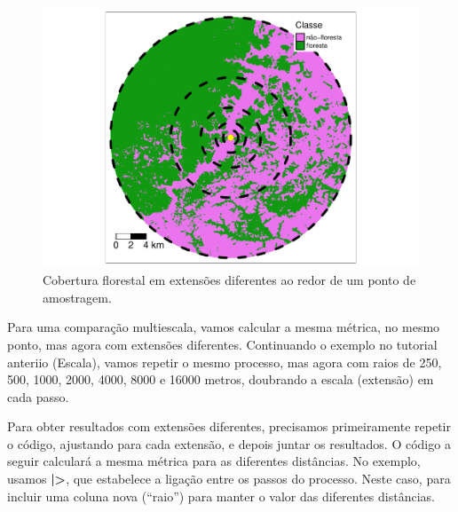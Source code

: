 \documentclass[
]{article}
\begin{document}
\begin{figure}
\centering
\includegraphics{epr_files/figure-latex/unnamed-chunk-30-1.pdf}
\caption{\label{fig:unnamed-chunk-30}Cobertura florestal em extensões diferentes ao redor de um ponto de amostragem.}
\end{figure}

Para uma comparação multiescala, vamos calcular a mesma métrica, no mesmo ponto, mas agora com extensões diferentes. Continuando o exemplo no tutorial anteriio (Escala), vamos repetir o mesmo processo, mas agora com raios de 250, 500, 1000, 2000, 4000, 8000 e 16000 metros, doubrando a escala (extensão) em cada passo.

\newpage

Para obter resultados com extensões diferentes, precisamos primeiramente repetir o código, ajustando para cada extensão, e depois juntar os resultados.
O código a seguir calculará a mesma métrica para as diferentes distâncias.
No exemplo, usamos \textbf{|>}, que estabelece a ligação entre os passos do processo. Neste caso, para incluir uma coluna nova (``raio'') para manter o valor das diferentes distâncias.
\end{document}
